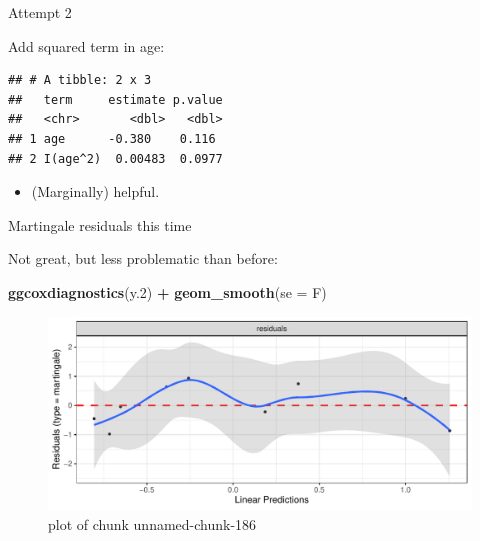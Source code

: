 \documentclass[ignorenonframetext,]{beamer}
\newenvironment{Shaded}{\begin{snugshade}}{\end{snugshade}}
\newcommand{\DataTypeTok}[1]{\textcolor[rgb]{0.13,0.29,0.53}{#1}}
\newcommand{\DecValTok}[1]{\textcolor[rgb]{0.00,0.00,0.81}{#1}}
\newcommand{\FloatTok}[1]{\textcolor[rgb]{0.00,0.00,0.81}{#1}}
\newcommand{\KeywordTok}[1]{\textcolor[rgb]{0.13,0.29,0.53}{\textbf{#1}}}
\newcommand{\NormalTok}[1]{#1}
\newcommand{\OperatorTok}[1]{\textcolor[rgb]{0.81,0.36,0.00}{\textbf{#1}}}
\newcommand{\StringTok}[1]{\textcolor[rgb]{0.31,0.60,0.02}{#1}}
\providecommand{\tightlist}{%
  \setlength{\itemsep}{0pt}\setlength{\parskip}{0pt}}
\begin{document}
\begin{frame}[fragile]{Attempt 2}
\protect\hypertarget{attempt-2}{}

Add squared term in age:

\begin{Shaded}
\end{Shaded}

\begin{verbatim}
## # A tibble: 2 x 3
##   term     estimate p.value
##   <chr>       <dbl>   <dbl>
## 1 age      -0.380    0.116 
## 2 I(age^2)  0.00483  0.0977
\end{verbatim}

\begin{itemize}
\tightlist
\item
  (Marginally) helpful.
\end{itemize}

\end{frame}

\begin{frame}[fragile]{Martingale residuals this time}
\protect\hypertarget{martingale-residuals-this-time}{}

Not great, but less problematic than before:

\begin{Shaded}
\begin{Highlighting}[]
\KeywordTok{ggcoxdiagnostics}\NormalTok{(y}\FloatTok{.2}\NormalTok{) }\OperatorTok{+}\StringTok{ }\KeywordTok{geom_smooth}\NormalTok{(}\DataTypeTok{se =}\NormalTok{ F)}
\end{Highlighting}
\end{Shaded}

\begin{figure}
\centering
\includegraphics{figure/unnamed-chunk-186-1.pdf}
\caption{plot of chunk unnamed-chunk-186}
\end{figure}

\end{frame}
\end{document}

